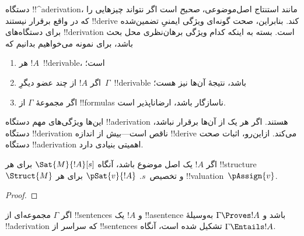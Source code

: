 \documentclass[../../../include/open-logic-section]{subfiles}
\begin{document}
      {}
      {}


\begin{explain}
دستگاه !!^a{derivation}، مانند استنتاج اصل‌موضوعی، \emph{صحیح} است اگر
نتواند چیزهایی را که در واقع برقرار نیستند !!{derive} کند. بنابراین،
صحت گونه‌ای ویژگی ایمنیِ تضمین‌شده برای دستگاه‌های !!{derivation} است.
بسته به اینکه کدام ویژگی برهان‌نظری محل بحث باشد، برای نمونه می‌خواهیم
بدانیم که
\begin{enumerate}
\item هر $!A$~!!{derivable}،  است؛
\item اگر $!A$ از چند عضو دیگرِ~$\Gamma$~!!{derivable} باشد، نتیجهٔ
  آن‌ها نیز هست؛
\item اگر مجموعهٔ $\Gamma$ از !!{formula}s ناسازگار باشد، ارضاناپذیر است.
\end{enumerate}
این‌ها ویژگی‌های مهم دستگاه !!a{derivation} هستند. اگر هر یک از آن‌ها
برقرار نباشد، دستگاه !!{derivation} ناقص است---بیش از اندازه !!{derive}
می‌کند. ازاین‌رو، اثبات صحت دستگاه !!a{derivation} اهمیتی بنیادی دارد.
\end{explain}

\begin{prop}
  اگر $!A$ یک اصل موضوع باشد، آنگاه
    {$\Sat{M}{!A}[s]$ برای هر !!{structure}~$\Struct{M}$ و تخصیص~$s$.}
    {$\pSat{v}{!A}$ برای هر !!{valuation}~$\pAssign{v}$.}
\end{prop}

\begin{proof}
\end{proof}

\begin{thm}[صحت]
اگر $\Gamma$ مجموعه‌ای از !!{sentence}s و $!A$ یک !!a{sentence} باشد و
$\Gamma \Proves !A$ به‌وسیلهٔ !!a{derivation} که سراسر از
!!{sentence}s تشکیل شده است، آنگاه $\Gamma \Entails !A$.
\end{thm}
\end{document}

